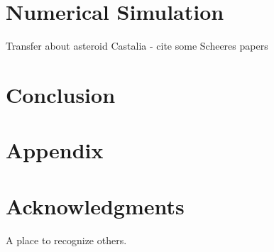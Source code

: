 \documentclass[]{aiaa-tc}%
\begin{document}
\section{Numerical Simulation}

Transfer about asteroid Castalia - cite some Scheeres papers

\section{Conclusion}



\section*{Appendix}


\section*{Acknowledgments}

A place to recognize others.

 

\end{document}
